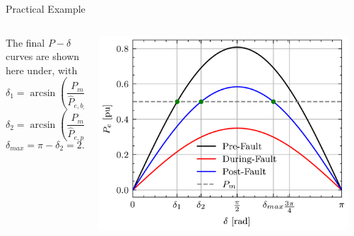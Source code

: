 \begin{frame}{Practical Example}
\begin{columns}
    \begin{column}{0.45\textwidth}
        The final $P-\delta$ curves are shown here under, with
        $$\delta_1 = \arcsin \left(\frac{P_m}{\hat{P}_{e,bf}}\right) = 0.667$$ $$\delta_2 = \arcsin \left(\frac{P_m}{\hat{P}_{e,pf}}\right) = 1.028$$ $$ \delta_{max} = \pi - \delta_2 = 2.114$$
    \end{column}
    \begin{column}{0.55\textwidth}
        \begin{center}
        \includegraphics[width=0.95\textwidth]{images/P-delta-example.png}
        \end{center}
    \end{column}
\end{columns}


\end{frame}

